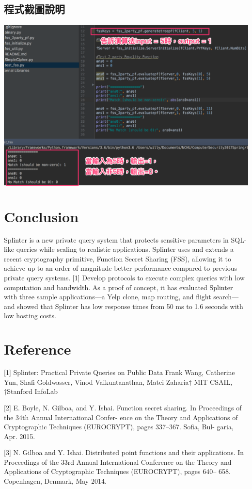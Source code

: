 \documentclass[12pt,a4paper]{article}
\begin{document}
\begin{multicols}{2}
\subsection{程式截圖說明}
\includegraphics[scale=0.25]{程式截圖說明.png}

\section{Conclusion}
Splinter is a new private query system that protects sensitive parameters in SQL-like queries while scaling to realistic applications. Splinter uses and extends a recent cryptography primitive, Function Secret Sharing (FSS), allowing it to achieve up to an order of magnitude better performance compared to previous private query systems. [1] Develop protocols to execute complex queries with low computation and bandwidth. As a proof of concept, it has evaluated Splinter with three sample applications—a Yelp clone, map routing, and flight search—and showed that Splinter has low response times from 50 ms to 1.6 seconds with low hosting costs.

\section{Reference}
[1] Splinter: Practical Private Queries on Public 
Data Frank Wang, Catherine Yun, Shafi Goldwasser, 
Vinod Vaikuntanathan, Matei Zaharia† MIT CSAIL, 
†Stanford InfoLab

[2] E. Boyle, N. Gilboa, and Y. Ishai. Function 
secret sharing. In Proceedings of the 34th Annual 
International Confer- ence on the Theory and 
Applications of Cryptographic Techniques 
(EUROCRYPT), pages 337–367. Sofia, Bul- garia, Apr. 
2015.

[3] N. Gilboa and Y. Ishai. Distributed point 
functions and their applications. In Proceedings of 
the 33rd Annual International Conference on the 
Theory and Applications of Cryptographic Techniques 
(EUROCRYPT), pages 640– 658. Copenhagen, Denmark, 
May 2014.
\end{multicols}
\end{document}
